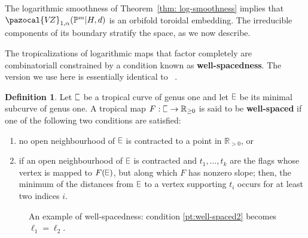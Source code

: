 \documentclass[11pt]{amsart}
\DeclareRobustCommand{\plE}{\text{\reflectbox{$\exists$}}}
\newcommand{\plC}{\scalebox{0.8}[1.3]{$\sqsubset$}}
\newcommand{\VZ}{\pazocal{V\!Z}}
\renewcommand{\to}{\rightarrow}
\theoremstyle{definition}
\theoremstyle{definition}
\newtheorem{definition}[thm]{Definition}
\begin{document}
\noindent The logarithmic smoothness of Theorem~\ref{thm: log-smoothness} implies that $\VZ_{1,\alpha}(\mathbb P^m|H,d)$ is an orbifold toroidal embedding. The irreducible components of its boundary stratify the space, as we now describe.

The tropicalizations of logarithmic maps that factor completely are combinatoriall constrained by a condition known as \textbf{well-spacedness}. The version we use here is essentially identical to~
\cite{RSPW2}. 

\begin{definition}
Let $\plC$ be a tropical curve of genus one and let $\plE$ be its minimal subcurve of genus one. A tropical map $F: \plC\to \mathbb R_{\geq 0}$ is said to be \textbf{well-spaced} if one of the following two conditions are satisfied:
\begin{enumerate}
    \item no open neighbourhood of $\plE$ is contracted to a point in $\mathbb R_{>0}$, or
    \item\label{pt:well-spaced2} if an open neighbourhood of $\plE$ is contracted and $t_1,\ldots,t_k$ are the flags whose vertex is mapped to $F(\plE)$, but along which $F$ has nonzero slope; then, the minimum of the distances from $\plE$ to a vertex supporting $t_i$ occurs for at least two indices $i$.
\end{enumerate}
\end{definition}

\begin{figure}
\caption{An example of well-spacedness: condition \eqref{pt:well-spaced2} becomes $\ell_1=\ell_2$.}
\label{fig:exa_well-spaced}
\end{figure}
\end{document}
